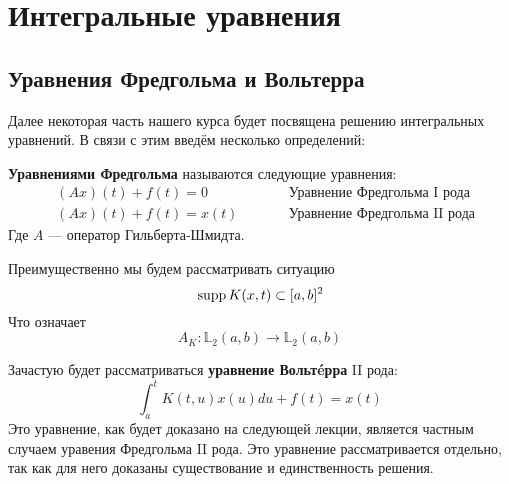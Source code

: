 \documentclass[12pt]{article}
\begin{document}
\section{Интегральные уравнения}

	\subsection{Уравнения Фредгольма и Вольтерра}

		Далее некоторая часть нашего курса будет посвящена решению интегральных уравнений. В связи с этим введём несколько определений:
	
		\begin{defi}
			\textbf{Уравнениями Фредгольма} называются следующие уравнения:
			\begin{align*}
				&(Ax)(t) + f(t) = 0 &\qquad &\text{Уравнение Фредгольма I рода} \\
				&(Ax)(t) + f(t) = x(t) &\qquad &\text{Уравнение Фредгольма II рода}
			\end{align*}
			Где $A$ --- оператор Гильберта-Шмидта.
		\end{defi}
	
		Преимущественно мы будем рассматривать ситуацию 
		$$\,\text{supp}\, K(x,t) \subset [a,b]^2$$
		Что означает
		$$A_K: \mathbb{L}_2(a,b) \rightarrow \mathbb{L}_2(a,b)$$
	
		Зачастую будет рассматриваться \textbf{уравнение Вольт\'eрра} II рода:
		$$\int_a^t K(t,u) x(u) du + f(t) = x(t)$$
		Это уравнение, как будет доказано на следующей лекции, является частным случаем уравения Фредгольма 
		II рода. Это уравнение рассматривается отдельно, так как для него доказаны существование и единственность
		решения.


\end{document}

